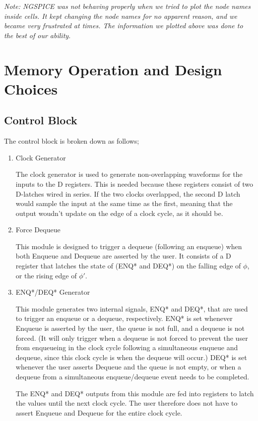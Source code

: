\documentclass[12pt]{report}
\begin{document}
\textit{Note: NGSPICE was not behaving properly when we tried to plot the node names inside cells. It kept changing the node names for no apparent reason, and we became very frustrated at times. The information we plotted above was done to the best of our ability.}

\newpage
\section*{Memory Operation and Design Choices}
\subsection*{Control Block}
The control block is broken down as follows;
\begin{enumerate}

  \item Clock Generator

  The clock generator is used to generate non-overlapping waveforms for the inputs to the D registers. This is needed because these registers consist of two D-latches wired in series. If the two clocks overlapped, the second D latch would sample the input at the same time as the first, meaning that the output woudn't update on the edge of a clock cycle, as it should be.

  \item Force Dequeue

  This module is designed to trigger a dequeue (following an enqueue) when both Enqueue and Dequeue are asserted by the user. It consists of a D register that latches the state of (ENQ* and DEQ*) on the falling edge of $\phi$, or the rising edge of $\phi'$.

  \item ENQ*/DEQ* Generator

  This module generates two internal signals, ENQ* and DEQ*, that are used to trigger an enqueue or a dequeue, respectively. ENQ* is set whenever Enqueue is asserted by the user, the queue is not full, and a dequeue is not forced. (It will only trigger when a dequeue is not forced to prevent the user from enqueueing in the clock cycle following a simultaneous enqueue and dequeue, since this clock cycle is when the dequeue will occur.) DEQ* is set whenever the user asserts Dequeue and the queue is not empty, or when a dequeue from a simultaneous enqueue/dequeue event needs to be completed.

  The ENQ* and DEQ* outputs from this module are fed into registers to latch the values until the next clock cycle. The user therefore does not have to assert Enqueue and Dequeue for the entire clock cycle.


\end{enumerate}
\end{document}
